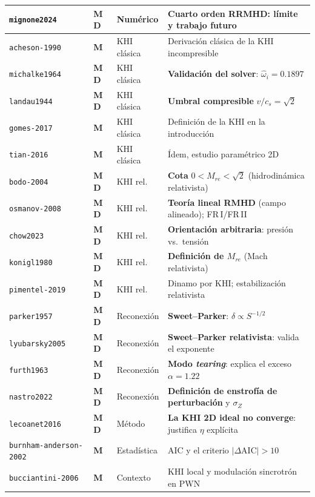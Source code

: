 \documentclass[11pt,openany]{report}
\newcommand{\clave}[1]{\texttt{\small #1}}
\newcommand{\Mono}{\textbf{\color{azulud}M}}
\newcommand{\Dia}{\textbf{\color{verdeok}D}}
\begin{document}
\begin{small}
\begin{longtable}{@{}p{} p{} p{} p{}@{}}
\clave{mignone2024}         & \Mono\,\Dia      & Numérico    & Cuarto orden RRMHD: límite y trabajo futuro \\
\midrule
\clave{acheson-1990}        & \Mono            & KHI clásica & Derivación clásica de la KHI incompresible \\
\clave{michalke1964}        & \Mono\,\Dia      & KHI clásica & \textbf{Validación del solver}: $\hat\omega_i=0.1897$ \\
\clave{landau1944}          & \Mono\,\Dia      & KHI clásica & \textbf{Umbral compresible} $v/c_s=\sqrt2$ \\
\clave{gomes-2017}          & \Mono            & KHI clásica & Definición de la KHI en la introducción \\
\clave{tian-2016}           & \Mono            & KHI clásica & Ídem, estudio paramétrico 2D \\
\midrule
\clave{bodo-2004}           & \Mono\,\Dia      & KHI rel.    & \textbf{Cota} $0<M_{re}<\sqrt2$ (hidrodinámica relativista) \\
\clave{osmanov-2008}        & \Mono\,\Dia      & KHI rel.    & \textbf{Teoría lineal RMHD} (campo alineado); FR\,I/FR\,II \\
\clave{chow2023}            & \Mono\,\Dia      & KHI rel.    & \textbf{Orientación arbitraria}: presión vs.\ tensión \\
\clave{konigl1980}          & \Mono\,\Dia      & KHI rel.    & \textbf{Definición de $M_{re}$} (Mach relativista) \\
\clave{pimentel-2019}       & \Mono\,\Dia      & KHI rel.    & Dinamo por KHI; estabilización relativista \\
\midrule
\clave{parker1957}          & \Mono\,\Dia      & Reconexión  & \textbf{Sweet--Parker}: $\delta\propto S^{-1/2}$ \\
\clave{lyubarsky2005}       & \Mono\,\Dia      & Reconexión  & \textbf{Sweet--Parker relativista}: valida el exponente \\
\clave{furth1963}           & \Mono\,\Dia      & Reconexión  & \textbf{Modo \textit{tearing}}: explica el exceso $\alpha=1.22$ \\
\clave{nastro2022}          & \Mono\,\Dia      & Reconexión  & \textbf{Definición de enstrofía de perturbación} y $\sigma_Z$ \\
\midrule
\clave{lecoanet2016}        & \Mono\,\Dia      & Método      & \textbf{La KHI 2D ideal no converge}: justifica $\eta$ explícita \\
\clave{burnham-anderson-2002} & \Mono          & Estadística & AIC y el criterio $|\Delta\mathrm{AIC}|>10$ \\
\midrule
\clave{bucciantini-2006}    & \Mono            & Contexto    & KHI local y modulación sincrotrón en PWN \\
\bottomrule
\end{longtable}
\end{small}
\end{document}
